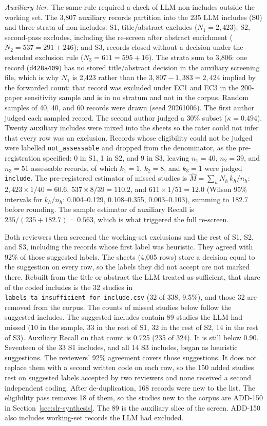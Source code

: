 \emph{Auxiliary tier.} The same rule required a check of LLM non-includes
outside the working set. The 3{,}807 auxiliary records partition into
the 235 LLM includes (S0) and three strata of non-includes: S1,
title/abstract excludes ($N_1=2{,}423$); S2, second-pass excludes,
including the re-screen after abstract enrichment ($N_2=537 = 291+246$);
and S3, records closed without a decision under the extended exclusion
rule ($N_3=611 = 595+16$). The strata sum to 3{,}806: one record
(\texttt{d428a409}) has no stored title/abstract decision in the
auxiliary screening file, which is why $N_1$ is 2{,}423 rather than the
$3{,}807-1{,}383=2{,}424$ implied by the forwarded count; that record was
excluded under EC1 and EC3 in the 200-paper sensitivity sample and is in
no stratum and not in the corpus. Random samples of 40, 40, and 60
records were drawn (seed 20261006). The first author judged each sampled
record. The second author judged a 30\% subset ($\kappa = 0.494$).
Twenty auxiliary includes were mixed into the sheets so the rater could
not infer that every row was an exclusion. Records whose eligibility
could not be judged were labelled \texttt{not\_assessable} and dropped
from the denominator, as the pre-registration specified: 0 in S1, 1 in
S2, and 9 in S3, leaving $n_1=40$, $n_2=39$, and $n_3=51$ assessable
records, of which $k_1=1$, $k_2=8$, and $k_3=1$ were judged
\texttt{include}. The pre-registered estimator of missed studies is
$\hat{M} = \sum_h N_h\,k_h/n_h$: $2{,}423 \times 1/40 = 60.6$,
$537 \times 8/39 = 110.2$, and $611 \times 1/51 = 12.0$ (Wilson 95\%
intervals for $k_h/n_h$: 0.004--0.129, 0.108--0.355, 0.003--0.103),
summing to 182.7 before rounding. The sample estimator of auxiliary
Recall is $235/(235+182.7) = 0.563$, which is what triggered the full
re-screen.

Both reviewers then screened the working-set exclusions and the rest of
S1, S2, and S3, including the records whose first label was heuristic.
They agreed with 92\% of those suggested labels. The sheets (4{,}005 rows)
store a decision equal to the suggestion on every row, so the labels they
did not accept are not marked there. Rebuilt from the title or abstract
the LLM treated as sufficient, that share of the coded includes is the 32
studies in \texttt{labels\_ta\_insufficient\_for\_include.csv} (32 of 338,
9.5\%), and those 32 are removed from the corpus. The counts of missed
studies below follow the suggested includes. The suggested includes
contain 89 studies the LLM
had missed (10 in the sample, 33 in the rest of S1, 32 in the rest of S2,
14 in the rest of S3). Auxiliary Recall on that count is 0.725 (235 of
324). It is still below 0.90. Seventeen of the 33 S1 includes, and all 14
S3 includes, began as heuristic suggestions. The reviewers' 92\% agreement
covers those suggestions. It does not replace them with a second written
code on each row, so the 150 added studies rest on suggested labels
accepted by two reviewers and none received a second independent
coding. After de-duplication, 168 records were new to the list. The eligibility
pass removes 18 of them, so the studies new to the corpus are ADD-150 in
Section~\ref{sec:slr-synthesis}. The 89 is the auxiliary slice of the
screen. ADD-150 also includes working-set records the LLM had excluded.

